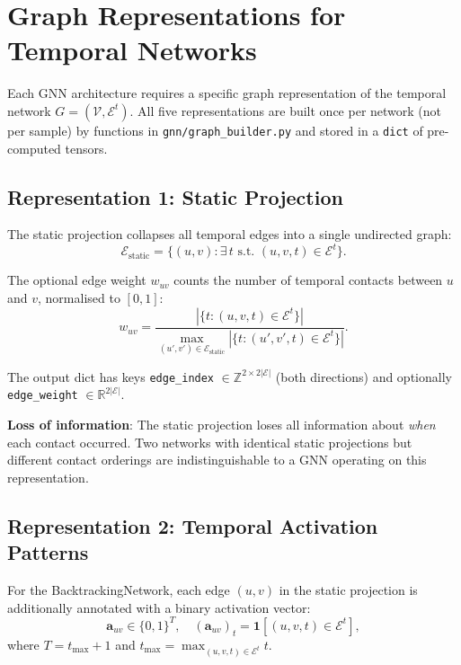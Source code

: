 \documentclass[12pt,a4paper]{report}
\newcommand{\R}{\mathbb{R}}
\newcommand{\calV}{\mathcal{V}}
\newcommand{\calE}{\mathcal{E}}
\begin{document}
\chapter{Graph Representations for Temporal Networks}
\label{chap:representations}

Each GNN architecture requires a specific graph representation of the temporal
network $G = (\calV, \calE^t)$. All five representations are built once per
network (not per sample) by functions in \texttt{gnn/graph\_builder.py} and
stored in a \texttt{dict} of pre-computed tensors.

\section{Representation 1: Static Projection}
\label{sec:static_rep}

The static projection collapses all temporal edges into a single undirected
graph:
\begin{equation}
  \calE_{\text{static}} = \{(u,v) : \exists\, t \text{ s.t. } (u,v,t) \in \calE^t\}.
\end{equation}

The optional edge weight $w_{uv}$ counts the number of temporal contacts between
$u$ and $v$, normalised to $[0,1]$:
\begin{equation}
  w_{uv} = \frac{|\{t : (u,v,t) \in \calE^t\}|}{\max_{(u',v') \in \calE_{\text{static}}} |\{t : (u',v',t) \in \calE^t\}|}.
\end{equation}

The output dict has keys \texttt{edge\_index} $\in \mathbb{Z}^{2 \times 2|\calE|}$
(both directions) and optionally \texttt{edge\_weight} $\in \R^{2|\calE|}$.

\textbf{Loss of information}: The static projection loses all information about
\emph{when} each contact occurred. Two networks with identical static
projections but different contact orderings are indistinguishable to a GNN
operating on this representation.

\section{Representation 2: Temporal Activation Patterns}
\label{sec:activation_rep}

For the BacktrackingNetwork, each edge $(u,v)$ in the static projection is
additionally annotated with a binary activation vector:
\begin{equation}
  \mathbf{a}_{uv} \in \{0,1\}^T, \quad (\mathbf{a}_{uv})_t = \mathbf{1}[(u,v,t) \in \calE^t],
\end{equation}
where $T = t_{\max} + 1$ and $t_{\max} = \max_{(u,v,t) \in \calE^t} t$.
\end{document}
